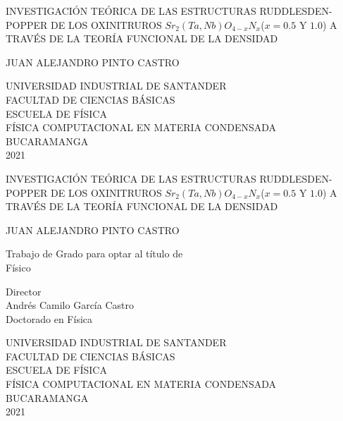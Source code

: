 
\thispagestyle{empty}

\begin{center}

INVESTIGACIÓN TEÓRICA DE LAS ESTRUCTURAS RUDDLESDEN-POPPER DE LOS OXINITRUROS $Sr_{2}(Ta,Nb)O_{4-x}N_{x}$($x=0.5$ Y $1.0$) A TRAVÉS DE LA TEORÍA FUNCIONAL DE LA DENSIDAD \vspace{6.83cm}

JUAN ALEJANDRO PINTO CASTRO\\
\vspace{6.83cm}

UNIVERSIDAD INDUSTRIAL DE SANTANDER\\
FACULTAD DE CIENCIAS BÁSICAS\\
ESCUELA DE FÍSICA\\
FÍSICA COMPUTACIONAL EN MATERIA CONDENSADA\\
BUCARAMANGA\\
2021\\

\end{center}


\newpage
\thispagestyle{empty}

\begin{center}

INVESTIGACIÓN TEÓRICA DE LAS ESTRUCTURAS RUDDLESDEN-POPPER DE LOS OXINITRUROS $Sr_{2}(Ta,Nb)O_{4-x}N_{x}$($x=0.5$ Y $1.0$) A TRAVÉS DE LA TEORÍA FUNCIONAL DE LA DENSIDAD \vspace{2.85cm}

JUAN ALEJANDRO PINTO CASTRO\\
\vspace{2.15cm}

Trabajo de Grado para optar al título de\\
Físico\\\vspace{2.35cm}

Director\\
Andrés Camilo García Castro\\
Doctorado en Física \vspace{2.35cm}

UNIVERSIDAD INDUSTRIAL DE SANTANDER\\
FACULTAD DE CIENCIAS BÁSICAS\\
ESCUELA DE FÍSICA\\
FÍSICA COMPUTACIONAL EN MATERIA CONDENSADA\\
BUCARAMANGA\\
2021\\

\end{center}

